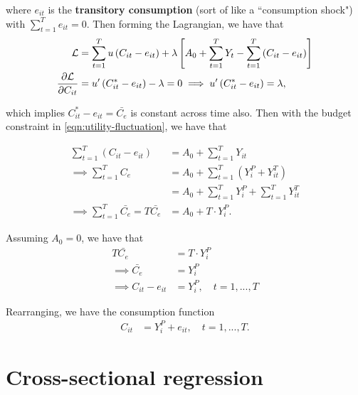\documentclass[../main.tex]{subfiles}
\begin{document}
        where $e_{it}$ is the \textbf{transitory consumption} (sort of like a ``consumption shock") with $\sum_{t=1}^T e_{it} = 0$. Then forming the Lagrangian, we have that
        \begin{align}
            \mathcal{L}
            &=
            \sum_{t=1}^T u\left(C_{it} - e_{it}\right)
            + \lambda \left[A_0 + \sum_{t=1}^T Y_t - \sum_{t=1}^T \left(C_{it} - e_{it}\right)\right]
            \\
            \frac{\partial \mathcal{L}}{\partial C_{it}}
            &= u'\left(C_{it}^* - e_{it}\right) - \lambda = 0
            \implies u'\left(C_{it}^* - e_{it}\right) = \lambda,
        \end{align}
        
        which implies $C_{it}^* - e_{it} = \bar{C_e}$ is constant across time also. Then with the budget constraint in \eqref{eqn:utility-fluctuation}, we have that
        
        \begin{align}
            \sum_{t=1}^T \left(C_{it} - e_{it}\right)
            &= A_0 + \sum_{t=1}^T Y_{it}
            \\ \implies
            \sum_{t=1}^T C_e
            &= A_0 + \sum_{t=1}^T (Y_{i}^P + Y_{it}^T)
            \\
            &= A_0 + \sum_{t=1}^T Y_{i}^P + \sum_{t=1}^T Y_{it}^T
            \\ \implies
            \sum_{t=1}^T \bar{C_e}
            = T \bar{C_e}
            &= A_0 + T \cdot Y_{i}^P.
        \end{align}
        
        Assuming $A_0 = 0$, we have that
        \begin{align}
            T \bar{C_e} &= T \cdot Y_{i}^P
            \\
            \implies 
            \bar{C_e} &= Y_{i}^P
            \\
            \implies
            C_{it} - e_{it} &= Y_{i}^P, \quad t = 1, ..., T
        \end{align}    
        
        Rearranging, we have the consumption function
        \begin{align}
            C_{it} &= Y_{i}^P + e_{it}, \quad t = 1, ..., T.
            \label{consumption-fluctuation}
        \end{align}
        
        
    \section{Cross-sectional regression}
    
\end{document}

